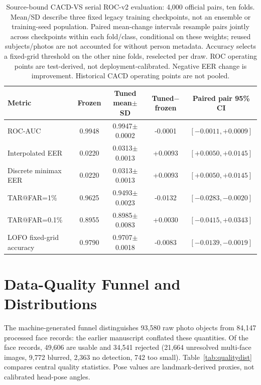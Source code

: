 \documentclass[journal]{IEEEtran}
\begin{document}
\begin{table}[!t]
\caption{Source-bound CACD-VS serial ROC-v2 evaluation: 4{,}000 official pairs, ten folds. Mean/SD describe three fixed legacy training checkpoints, not an ensemble or training-seed population. Paired mean-change intervals resample pairs jointly across checkpoints within each fold/class, conditional on these weights; reused subjects/photos are not accounted for without person metadata. Accuracy selects a fixed-grid threshold on the other nine folds, reselected per draw. ROC operating points are test-derived, not deployment-calibrated. Negative EER change is improvement. Historical CACD operating points are not pooled.}
\label{tab:cacd-serial-roc-v2}
\centering\footnotesize
\begin{tabular}{@{}lcccc@{}}
\toprule
Metric & Frozen & Tuned mean$\pm$SD & Tuned$-$frozen & Paired pair 95\% CI \\
\midrule
ROC-AUC & 0.9948 & 0.9947$\pm$0.0002 & -0.0001 & $[-0.0011,+0.0009]$ \\
Interpolated EER & 0.0220 & 0.0313$\pm$0.0013 & +0.0093 & $[+0.0050,+0.0145]$ \\
Discrete minimax EER & 0.0220 & 0.0313$\pm$0.0013 & +0.0093 & $[+0.0050,+0.0145]$ \\
TAR@FAR=1\% & 0.9625 & 0.9493$\pm$0.0023 & -0.0132 & $[-0.0283,-0.0020]$ \\
TAR@FAR=0.1\% & 0.8955 & 0.8985$\pm$0.0083 & +0.0030 & $[-0.0415,+0.0343]$ \\
LOFO fixed-grid accuracy & 0.9790 & 0.9707$\pm$0.0018 & -0.0083 & $[-0.0139,-0.0019]$ \\
\bottomrule
\end{tabular}
\end{table}

\section{Data-Quality Funnel and Distributions}\label{sec:quality}
The machine-generated funnel distinguishes 93{,}580 raw photo objects from 84{,}147 processed face
records: the earlier manuscript conflated these quantities. Of the face records, 49{,}606 are usable
and 34{,}541 rejected (21{,}664 unresolved multi-face images, 9{,}772 blurred, 2{,}363 no detection,
742 too small). Table~\ref{tab:qualitydist} compares central quality statistics. Pose values are
landmark-derived proxies, not calibrated head-pose angles.
\end{document}
